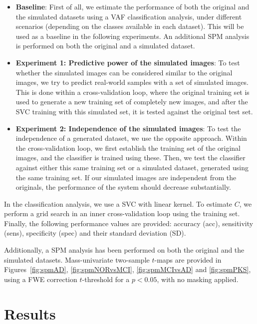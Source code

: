 \begin{itemize}
	\item \textbf{Baseline}: First of all, we estimate the performance of both the original and the simulated datasets using a \ac{VAF} \cite{Stoeckel04} classification analysis, under different scenarios (depending on the classes available in each dataset). This will be used as a baseline in the following experiments. An additional \ac{SPM} \cite{spm_book} analysis is performed on both the original and a simulated dataset. 
	\item \textbf{Experiment 1: Predictive power of the simulated images}: To test whe\-ther the simulated images can be considered similar to the original images, we try to predict real-world samples with a set of simulated images. This is done within a cross-validation loop, where the original training set is used to generate a new training set of completely new images, and after the \ac{SVC} training with this simulated set, it is tested against the original test set.  
	\item \textbf{Experiment 2: Independence of the simulated images}: To test the independence of a generated dataset, we use the opposite approach. Within the cross-validation loop, we first establish the training set of the original images, and the classifier is trained using these. Then, we test the classifier against either this same training set or a simulated dataset, generated using the same training set. If our simulated images are independent from the originals, the performance of the system should decrease substantially. 
\end{itemize}

In the classification analysis, we use a \ac{SVC} with linear kernel. To estimate $C$, we perform a grid search in an inner cross-validation loop using the training set. Finally, the following performance values are provided: accuracy (acc), sensitivity (sens), specificity (spec) and their standard deviation (SD). 

Additionally, a \ac{SPM} analysis \cite{spm_book} has been performed on both the original and the simulated datasets. Mass-univariate two-sample $t$-maps are provided in Figures~\ref{fig:spmAD}, \ref{fig:spmNORvsMCI}, \ref{fig:spmMCIvsAD} and \ref{fig:spmPKS}, using a \ac{FWE} correction $t$-threshold for a $p<0.05$, with no masking applied. 

\section{Results}
\label{sec:resultsSynthesis}
